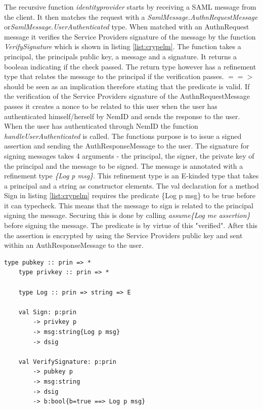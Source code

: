 \documentclass[twosided]{report}
\begin{document}
The recursive function \emph{identityprovider} starts by receiving a SAML message from the client. It then matches the request with a \emph{SamlMessage.AuthnRequestMessage} or\emph{SamlMessage.UserAuthenticated} type. When matched with an AuthnRequest message it verifies the Service Providers signature of the message by the function \emph{VerifySignature} which is shown in listing \ref{list:crypelm}. The function takes a principal, the principals public key, a message and a signature. It returns a boolean indicating if the check passed. The return type however has a refinement type that relates the message to the principal if the verification passes. $==>$ should be seen as an implication therefore stating that the predicate is valid. If the verification of the Service Providers signature of the AuthnRequestMessage passes it creates a nonce to be related to this user when the user has authenticated himself/herself by NemID and sends the response to the user. When the user has authenticated through NemID the function \emph{handleUserAuthenticated} is called. The functions purpose is to issue a signed assertion and sending the AuthResponseMessage to the user. The signature for signing messages takes 4 arguments - the principal, the signer, the private key of the principal and the message to be signed. The message is annotated with a refinement type \emph{\{Log p msg\}}. This refinement type is an E-kinded type that takes a principal and a string as constructor elements. The val declaration for a method Sign in listing \ref{list:crypelm} requires the predicate \{Log p msg\} to be true before it can typecheck. This means that the message to sign is related to the principal signing the message. Securing this is done by calling \emph{assume\{Log me assertion\}} before signing the message. The predicate is by virtue of this "verified". After this the assertion is encrypted by using the Service Providers public key and sent within an AuthResponseMessage to the user.

\begin{lstlisting}[style=fstar, caption={Cryptographic elements}, label={list:crypelm}]
	type pubkey :: prin => *
	type privkey :: prin => *

	type Log :: prin => string => E
	
	val Sign: p:prin
		-> privkey p
		-> msg:string{Log p msg}
		-> dsig

	val VerifySignature: p:prin
		-> pubkey p 	
		-> msg:string
		-> dsig
		-> b:bool{b=true ==> Log p msg}
\end{lstlisting}
\end{document}
